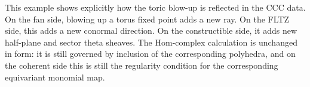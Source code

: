 This example shows explicitly how the toric blow-up is reflected in the CCC
data. On the fan side, blowing up a torus fixed point adds a new ray. On the
FLTZ side, this adds a new conormal direction. On the constructible side, it
adds new half-plane and sector theta sheaves. The Hom-complex calculation is
unchanged in form: it is still governed by inclusion of the corresponding
polyhedra, and on the coherent side this is still the regularity condition for
the corresponding equivariant monomial map.

